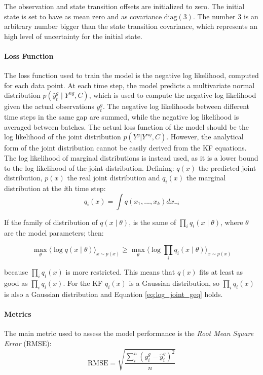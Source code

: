 \documentclass{article}
\newcommand{\E}[1]{\langle #1 \rangle} %
\begin{document}
The observation and state transition offsets are initialized to zero. The initial state is set to have as mean zero and as covariance $\text{diag}(3)$. The number 3 is an arbitrary number bigger than the state transition covariance, which represents an high level of uncertainty for the initial state.  

\paragraph{Loss Function}

The loss function used to train the model is the negative log likelihood, computed for each data point. At each time step, the model predicts a multivariate normal distribution $p(\hat{y}^g_t \mid Y^{ng}, C)$, which is used to compute the negative log likelihood given the actual observations $y_t^g$. The negative log likelihoods between different time steps in the same gap are summed, while the negative log likelihood is averaged between batches.
The actual loss function of the model should be the log likelihood of the joint distribution $p(Y^g|Y^{ng}, C)$. However, the analytical form of the joint distribution cannot be easily derived from the KF equations. The log likelihood of marginal distributions is instead used, as it is a lower bound to the log likelihood of the joint distribution. Defining: $q(x)$ the predicted joint distribution, $p(x)$ the real joint distribution and $q_i(x)$ the marginal distribution at the \textit{i}th time step:
\begin{equation*}
    q_i(x) = \int q(x_1, ..., x_k)dx_{\neg i}
\end{equation*}

If the family of distribution of $q(x \mid \theta)$,  is the same of $\prod_i q_i(x \mid \theta)$, where $\theta$ are the model parameters; then:

\begin{equation}\label{eq:log_joint_geq}
    \max_\theta \E{\log q(x\mid \theta)}_{x \sim p(x)} \geq \max_\theta \E{\log \prod_i q_i(x\mid \theta)}_{x \sim p(x)}
\end{equation}

because $\prod_i q_i(x)$ is more restricted. This means that $q(x)$ fits at least as good as $\prod_i q_i(x)$.
For the KF $q_i(x)$ is a Gaussian distribution, so $\prod_i q_i(x)$ is also a Gaussian distribution and Equation \ref{eq:log_joint_geq} holds.

\paragraph{Metrics} The main metric used to assess the model performance is the \emph{Root Mean Square Error} (RMSE):
\begin{equation*}
    \text{RMSE} = \sqrt{\frac{\sum_i^n (y^g_i - \hat{y}^g_i)^2}{n}}
\end{equation*}
\end{document}
